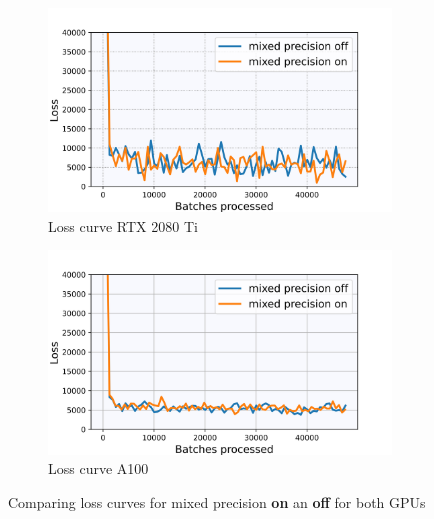 \begin{figure} \label{fig:5.6}
    \centering
    \begin{subfigure}[b]{0.49\textwidth}
        \centering
         \includegraphics[width=\textwidth]{Chapters/figures/mixed_prec_rtx2080_loss.jpg}
         \caption{Loss curve RTX 2080 Ti}
    \end{subfigure}
    \begin{subfigure}[b]{0.49\textwidth}
        \centering
         \includegraphics[width=\textwidth]{Chapters/figures/mixed_prec_a100_loss.jpg}
         \caption{Loss curve A100}
    \end{subfigure}
    \caption{Comparing loss curves for mixed precision \textbf{on} an \textbf{off} for both GPUs}
\end{figure}
%
